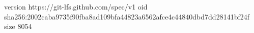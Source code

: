 version https://git-lfs.github.com/spec/v1
oid sha256:2002caba9735f90fba8ad109bfa44823a6562afce4c44840dbd7dd28141bf24f
size 8054
